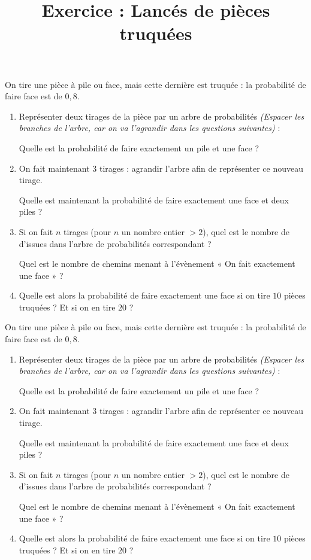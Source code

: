\documentclass[
	classe=$1^{ere}STI2D$,
	landscape,
	twocolumn
]{exercice}
\title{Exercice : Lancés de pièces truquées}
\begin{document}
\newcommand{\Exercice}{
	\maketitle

	\begin{tcolorbox}
		On tire une pièce à pile ou face, mais cette dernière est truquée : la probabilité de faire face est de $0,8$.
	\end{tcolorbox}

	\begin{enumerate}
		\item Représenter deux tirages de la pièce par un arbre de probabilités \textit{(Espacer les branches de l'arbre, car on va l'agrandir dans les questions suivantes)} :

		      \vfill

		      Quelle est la probabilité de faire exactement un pile et une face ?
		\item On fait maintenant 3 tirages : agrandir l'arbre afin de représenter ce nouveau tirage.

		      Quelle est maintenant la probabilité de faire exactement une face et deux piles ?
		\item Si on fait $n$ tirages (pour $n$ un nombre entier $> 2$), quel est le nombre de d'issues dans l'arbre de probabilités correspondant ?
	
	 Quel est le nombre de chemins menant à l'évènement « On fait exactement une face » ?
		\item Quelle est alors la probabilité de faire exactement une face si on tire $10$ pièces truquées ? Et si on en tire $20$ ?
	\end{enumerate}
}

\Exercice

\newpage

\Exercice
\end{document}
